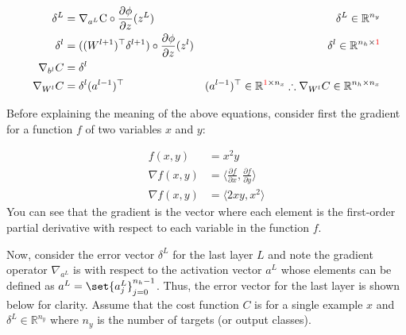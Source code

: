 \documentclass{article}
\DeclarePairedDelimiter\set\{\}
\newcommand{\colorvar}[2]{
	\begingroup\color{#1}{#2}\endgroup
}
\begin{document}
\begin{align}
	\delta^{L}       & = \nabla_{a^{L}} \text{C} \circ \frac{\partial \phi}{\partial z}(z^{L})         & \text{$\delta^{L} \in \mathbb{R}^{n_y}$}                                                                                            \\
	\delta^{l}       & = ((W^{l+1})^{\top} \delta^{l+1}) \circ \frac{\partial \phi}{\partial z}(z^{l}) & \text{$\delta^{l} \in \mathbb{R}^{n_h \times \colorvar{red}{1}}$}                                                                   \\
	\nabla_{b^{l}} C & = \delta^{l}                                                                                                                                                                                                          \\
	\nabla_{W^{l}} C & = \delta^{l} (a^{l-1})^{\top}                                                   & \text{$(a^{l-1})^{\top} \in \mathbb{R}^{\colorvar{red}{1} \times n_x} \therefore \nabla_{W^{l}} C \in \mathbb{R}^{n_h \times n_x}$}
\end{align}

Before explaining the meaning of the above equations,
consider first the gradient for a function $f$ of two variables $x$ and $y$:

\begin{align}
	f(x, y)        & = x^{2} y                                                                      \\
	\nabla f(x, y) & = \langle \frac{\partial f}{\partial x}, \frac{\partial f}{\partial y} \rangle \\
	\nabla f(x, y) & = \langle 2xy, x^{2} \rangle
\end{align}
You can see that the gradient is the vector where each element is the first-order
partial derivative with respect to each variable in the function $f$.

Now, consider the error vector $\delta^{L}$ for the last layer $L$ and note the gradient operator
$\nabla_{a^{L}}$ is with respect to the activation vector $a^{L}$ whose elements
can be defined as $a^{L} = \set{a_j^{L}}_{j=0}^{n_h - 1}$.
Thus, the error vector for the last layer is shown below for clarity. Assume that the cost
function $C$ is for a single example $x$ and $\delta^{L} \in \mathbb{R}^{n_y}$
where $n_y$ is the number of targets (or output classes).
\end{document}
